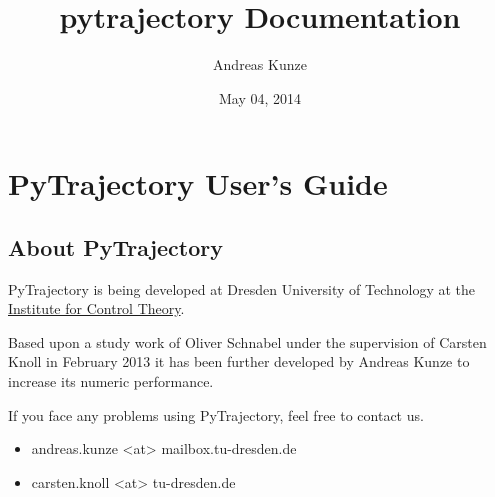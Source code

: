 \documentclass[letterpaper,10pt,english]{sphinxmanual}
\title{pytrajectory Documentation}
\date{May 04, 2014}
\author{Andreas Kunze}
\begin{document}
\maketitle
\tableofcontents
{}\label{index::doc}



\chapter{PyTrajectory User's Guide}
\label{guide/index:pytrajectory-user-s-guide}\label{guide/index:welcome-to-pytrajectory-s-documentation}\label{guide/index::doc}

\section{About PyTrajectory}
\label{guide/about:about-pytrajectory}\label{guide/about::doc}
PyTrajectory is being developed at Dresden University of Technology at the
\href{http://www.et.tu-dresden.de/rst/}{Institute for Control Theory}.

Based upon a study work of Oliver Schnabel under the supervision of Carsten Knoll in February 2013
it has been further developed by Andreas Kunze to increase its numeric performance.

If you face any problems using PyTrajectory, feel free to contact us.
\begin{itemize}
\item {} 
andreas.kunze \textless{}at\textgreater{} mailbox.tu-dresden.de

\item {} 
carsten.knoll \textless{}at\textgreater{} tu-dresden.de

\end{itemize}
\end{document}
